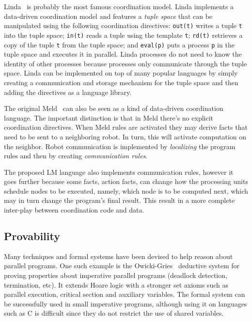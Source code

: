 Linda~\cite{linda} is probably the most famous coordination model. Linda implements a data-driven coordination model
and features a \emph{tuple space} that can be manipulated using the following coordination directives: \texttt{out(t)}
writes a tuple \texttt{t} into the tuple space; \texttt{in(t)} reads a tuple using the template \texttt{t}; \texttt{rd(t)} retrieves
a copy of the tuple \texttt{t} from the tuple space; and \texttt{eval(p)} puts a process \texttt{p} in the tuple space and executes it in parallel.
Linda processes do not need to know the identity of other processes because processes only communicate through the tuple space.
Linda can be implemented on top of many popular languages by simply creating a communication and storage mechanism for the tuple space
and then adding the directives as a language library.

The original Meld~\cite{ashley-rollman-iclp09} can also be seen as a kind of data-driven coordination language. The important distinction is that
in Meld there's no explicit coordination directives. When Meld rules are activated they may derive facts that need to be sent to a neighboring robot. In turn, this will activate computation on the neighbor. Robot communication is implemented by \emph{localizing} the program rules
and then by creating \emph{communication rules}.

The proposed LM language also implements communication rules, however it goes further because
some facts, action facts, can change how the processing units schedule nodes to be executed, namely, which node is to be computed next, which may in turn change
the program's final result. This result in a more complete inter-play between coordination code and data.

\subsection{Provability}

Many techniques and formal systems have been devised to help reason about parallel programs.
One such example is the Owicki-Gries~\cite{Owicki:1976:VPP:360051.360224} deductive system
for proving properties about imperative parallel programs (deadlock detection, termination, etc).
It extends Hoare logic with a stronger set axioms such as parallel execution, critical section
and auxiliary variables. The formal system can be successfully used in small imperative
programs, although using it on languages such as C is difficult since they do not
restrict the use of shared variables.

